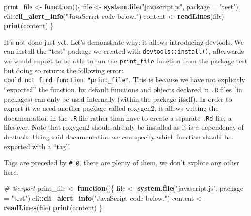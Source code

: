 \documentclass[
]{krantz}
\makeatletter
\newenvironment{Shaded}{\begin{snugshade}}{\end{snugshade}}
\newcommand{\CommentTok}[1]{\textcolor[rgb]{0.37,0.37,0.37}{\textit{#1}}}
\newcommand{\ControlFlowTok}[1]{\textcolor[rgb]{0.27,0.27,0.27}{\textbf{#1}}}
\newcommand{\DataTypeTok}[1]{\textcolor[rgb]{0.27,0.27,0.27}{#1}}
\newcommand{\KeywordTok}[1]{\textcolor[rgb]{0.27,0.27,0.27}{\textbf{#1}}}
\newcommand{\NormalTok}[1]{#1}
\newcommand{\OperatorTok}[1]{\textcolor[rgb]{0.43,0.43,0.43}{\textbf{#1}}}
\newcommand{\StringTok}[1]{\textcolor[rgb]{0.5,0.5,0.5}{#1}}
\newenvironment{kframe}{%
\medskip{}
\setlength{\fboxsep}{.8em}
 \def\at@end@of@kframe{}%
 \ifinner\ifhmode%
  \def\at@end@of@kframe{\end{minipage}}%
  \begin{minipage}{\columnwidth}%
 \fi\fi%
 \def\FrameCommand##1{\hskip\@totalleftmargin \hskip-\fboxsep
 \colorbox{shadecolor}{##1}\hskip-\fboxsep
     \hskip-\linewidth \hskip-\@totalleftmargin \hskip\columnwidth}%
 \MakeFramed {\advance\hsize-\width
   \@totalleftmargin\z@ \linewidth\hsize
   \@setminipage}}%
 {\par\unskip\endMakeFramed%
 \at@end@of@kframe}
\renewenvironment{Shaded}{\begin{kframe}}{\end{kframe}}
\makeatother
\begin{document}
\begin{Shaded}
\begin{Highlighting}[]
\NormalTok{print\_file \textless{}{-}}\StringTok{ }\ControlFlowTok{function}\NormalTok{()\{}
\NormalTok{  file \textless{}{-}}\StringTok{ }\KeywordTok{system.file}\NormalTok{(}\StringTok{"javascript.js"}\NormalTok{, }\DataTypeTok{package =} \StringTok{"test"}\NormalTok{)}
\NormalTok{  cli}\OperatorTok{::}\KeywordTok{cli\_alert\_info}\NormalTok{(}\StringTok{"JavaScript code below."}\NormalTok{)}
\NormalTok{  content \textless{}{-}}\StringTok{ }\KeywordTok{readLines}\NormalTok{(file)}
  \KeywordTok{print}\NormalTok{(content)}
\NormalTok{\}}
\end{Highlighting}
\end{Shaded}

It's not done just yet. Let's demonstrate why: it allows introducing devtools. We can install the ``test'' package we created with \texttt{devtools::install()}, afterwards we would expect to be able to run the \texttt{print\_file} function from the package test but doing so returns the following error: \texttt{could\ not\ find\ function\ "print\_file"}. This is because we have not explicitly ``exported'' the function, by default functions and objects declared in \texttt{.R} files (in packages) can only be used internally (within the package itself). In order to export it we need another package called roxygen2, it allows writing the documentation in the \texttt{.R} file rather than have to create a separate \texttt{.Rd} file, a lifesaver. Note that roxygen2 should already be installed as it is a dependency of devtools. Using said documentation we can specify which function should be exported with a ``tag''.

Tags are preceded by \texttt{\#\textquotesingle{}\ @}, there are plenty of them, we don't explore any other here.

\begin{Shaded}
\begin{Highlighting}[]
\CommentTok{\#\textquotesingle{} @export}
\NormalTok{print\_file \textless{}{-}}\StringTok{ }\ControlFlowTok{function}\NormalTok{()\{}
\NormalTok{  file \textless{}{-}}\StringTok{ }\KeywordTok{system.file}\NormalTok{(}\StringTok{"javascript.js"}\NormalTok{, }\DataTypeTok{package =} \StringTok{"test"}\NormalTok{)}
\NormalTok{  cli}\OperatorTok{::}\KeywordTok{cli\_alert\_info}\NormalTok{(}\StringTok{"JavaScript code below."}\NormalTok{)}
\NormalTok{  content \textless{}{-}}\StringTok{ }\KeywordTok{readLines}\NormalTok{(file)}
  \KeywordTok{print}\NormalTok{(content)}
\NormalTok{\}}
\end{Highlighting}
\end{Shaded}
\end{document}
